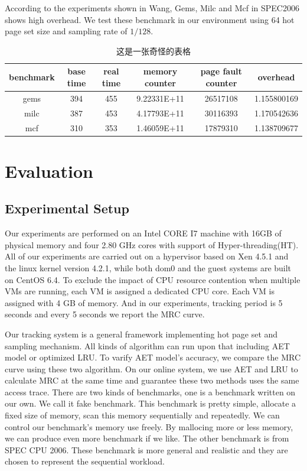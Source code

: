 \documentclass[10pt,twocolumn]{article}
\begin{document}
According to the experiments shown in Wang\cite{Wang2016Dynamic}, Gems, Milc and Mcf in SPEC2006 shows high overhead. We test these benchmark in our environment using 64 hot page set size and sampling rate of $1/128$.
\begin{table}[!htbp]
	\centering
	\caption{这是一张奇怪的表格}\label{tab:aStrangeTable}
	\begin{tabular}{cccccc}
		\toprule
		benchmark & base time & real time & memory counter & page fault counter & overhead \\
		\midrule
		gems & 394 & 455 & 9.22331E+11 & 26517108 & 1.155800169 \\
		milc & 387 & 453 & 4.17793E+11 & 30116393 & 1.170542636 \\
		mcf & 310 & 353 & 1.46059E+11 & 17879310 & 1.138709677 \\
		\bottomrule
	\end{tabular}
\end{table}

\section{Evaluation}
\subsection{Experimental Setup}
Our experiments are performed on an Intel CORE I7 machine with 16GB of physical memory and four 2.80 GHz cores with support of Hyper-threading(HT). All of our experiments are carried out on a hypervisor based on Xen 4.5.1 and the linux kernel version 4.2.1, while both dom0 and the guest systems are built on CentOS 6.4. To exclude the impact of CPU resource contention when multiple VMs are running, each VM is assigned a dedicated CPU core. Each VM is assigned with 4 GB of memory. And in our experiments, tracking period is 5 seconds and every 5 seconds we report the MRC curve.

Our tracking system is a general framework implementing hot page set and sampling mechanism. All kinds of algorithm can run upon that including AET model or optimized LRU. To varify AET model's accuracy, we compare the MRC curve using these two algorithm. On our online system, we use AET and LRU to calculate MRC at the same time and guarantee these two methods uses the same access trace. There are two kinds of benchmarks, one is a benchmark written on our own. We call it fake benchmark. This benchmark is pretty simple, allocate a fixed size of memory, scan this memory sequentially and repeatedly. We can control our benchmark's memory use freely. By mallocing more or less memory, we can produce even more benchmark if we like. The other benchmark is from SPEC CPU 2006\cite{Henning2000spec}. These benchmark is more general and realistic and they are chosen to represent the sequential workload.
\end{document}
